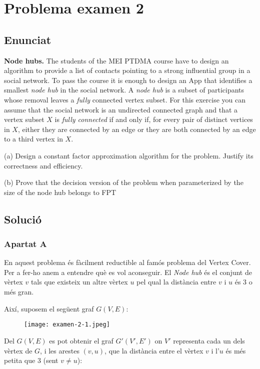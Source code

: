\section{Problema examen 2}
\subsection{Enunciat}
\textbf{Node hubs.} The students of the MEI PTDMA course have to design an algorithm to provide a list of contacts pointing to a strong influential group in a social network. To pass the course it is enough to design an App that identifies a smallest \textit{node hub} in the social network. A \textit{node hub} is a subset of participants whose removal leaves a \textit{fully} connected vertex subset. For this exercise you can assume that the social network is an undirected connected graph and
that a vertex subset $X$ is \textit{fully connected} if and only if, for every pair of distinct vertices in $X$, either they are connected by an edge or they are both connected by an edge to a third vertex in $X$.


(a) Design a constant factor approximation algorithm for the problem. Justify its correctness and efficiency. 

(b) Prove that the decision version of the problem when parameterized by the size of the node hub belongs to FPT

\subsection{Solució}
\subsubsection{Apartat A}
En aquest problema és fàcilment reductible al famós problema del Vertex Cover. Per a fer-ho anem a entendre què es vol aconseguir. El \textit{Node hub} és el conjunt de vèrtex $v$ tals que existeix un altre vèrtex $u$ pel qual la distància entre $v$ i $u$ és 3 o més gran.


Així, suposem el següent graf $G(V,E)$:

\begin{figure}[H]
    \centering
    \texttt{[image: examen-2-1.jpeg]}
    \label{fig:ex2-1}
\end{figure}


Del $G(V,E)$ es pot obtenir el graf $G'(V',E')$ on $V'$ representa cada un dels vèrtex de $G$, i les arestes $(v,u)$, que la distància entre el vèrtex $v$ i l'$u$ és més petita que 3 (sent $v \neq u$):

